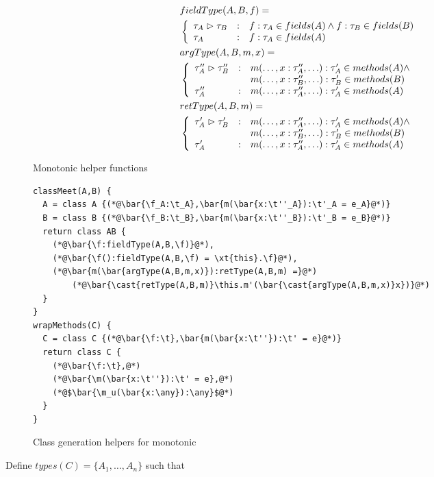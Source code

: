 \documentclass{sigplanconf}
\newcommand{\spec}{\vartriangleright}
\begin{document}
\begin{figure}
\begin{align*}
&fieldType(A,B,f) = \\
&\left\{\begin{array}{lcl}
\t_A \spec \t_B &:& f:\t_A \in fields(A) \wedge f:\t_B\in fields(B)\\
\t_A &:& f:\t_A \in fields(A) 
\end{array}\right.\\
&argType(A,B,m,x) =\\
&\left\{\begin{array}{lcl}
\t''_A \spec \t''_B &:& m(\ldots,{x:\t''_A},\ldots):\t'_A\in methods(A) \wedge \\
&&m(\ldots,x:\t''_B,\ldots):\t'_B \in methods(B)\\
\t''_A &:& m(\ldots,{x:\t''_A},\ldots):\t'_A\in methods(A) 
\end{array}\right.\\
&retType(A,B,m) = \\
&\left\{\begin{array}{lcl}
\t'_A \spec \t'_B &:& m(\ldots,{x:\t''_A},\ldots):\t'_A\in methods(A) \wedge \\
&&m(\ldots,x:\t''_B,\ldots):\t'_B \in methods(B)\\
\t'_A &:& m(\ldots,{x:\t''_A},\ldots):\t'_A\in methods(A) 
\end{array}\right.
\end{align*}
\caption{Monotonic helper functions}
\end{figure}

\begin{figure}
\begin{lstlisting}
classMeet(A,B) {
  A = class A {(*@\bar{\f_A:\t_A},\bar{m(\bar{x:\t''_A}):\t'_A = e_A}@*)}
  B = class B {(*@\bar{\f_B:\t_B},\bar{m(\bar{x:\t''_B}):\t'_B = e_B}@*)}
  return class AB {
    (*@\bar{\f:fieldType(A,B,\f)}@*),
    (*@\bar{\f():fieldType(A,B,\f) = \xt{this}.\f}@*),
    (*@\bar{m(\bar{argType(A,B,m,x)}):retType(A,B,m) =}@*)
    	(*@\bar{\cast{retType(A,B,m)}\this.m'(\bar{\cast{argType(A,B,m,x)}x})}@*)
  }
}
wrapMethods(C) {
  C = class C {(*@\bar{\f:\t},\bar{m(\bar{x:\t''}):\t' = e}@*)}
  return class C {
  	(*@\bar{\f:\t},@*)
  	(*@\bar{\m(\bar{x:\t''}):\t' = e},@*)
    (*@$\bar{\m_u(\bar{x:\any}):\any}$@*)
  }
}
\end{lstlisting}
\caption{Class generation helpers for monotonic}
\end{figure}

Define $types(C) = \{A_1,\ldots,A_n\}$ such that 
\end{document}
